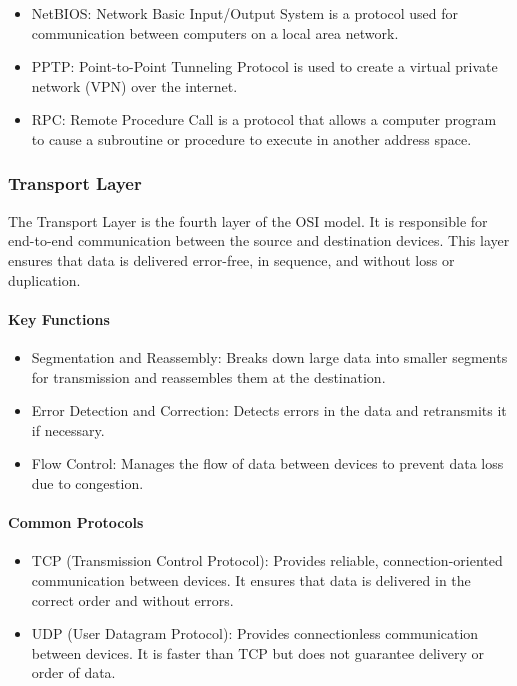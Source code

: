 \documentclass[a4paper]{article}
\begin{document}
    \begin{itemize}
        \item NetBIOS: Network Basic Input/Output System is a protocol used for communication between computers on a local area network.
        \item PPTP: Point-to-Point Tunneling Protocol is used to create a virtual private network (VPN) over the internet.
        \item RPC: Remote Procedure Call is a protocol that allows a computer program to cause a subroutine or procedure to execute in another address space.
    \end{itemize}

    \subsubsection{Transport Layer}

    The Transport Layer is the fourth layer of the OSI model. It is responsible for end-to-end communication between the source and destination devices. This layer ensures that data is delivered error-free, in sequence, and without loss or duplication.

    \paragraph{Key Functions}
    
    \begin{itemize}
        \item Segmentation and Reassembly: Breaks down large data into smaller segments for transmission and reassembles them at the destination.
        \item Error Detection and Correction: Detects errors in the data and retransmits it if necessary.
        \item Flow Control: Manages the flow of data between devices to prevent data loss due to congestion.
    \end{itemize}

    \paragraph{Common Protocols}
    
    \begin{itemize}
        \item TCP (Transmission Control Protocol): Provides reliable, connection-oriented communication between devices. It ensures that data is delivered in the correct order and without errors.
        \item UDP (User Datagram Protocol): Provides connectionless communication between devices. It is faster than TCP but does not guarantee delivery or order of data.
    \end{itemize}
\end{document}
